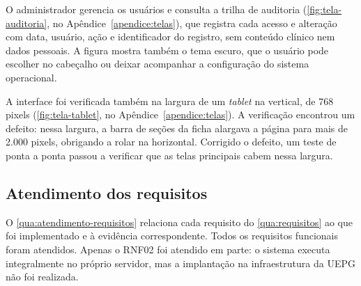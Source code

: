 O administrador gerencia os usuários e consulta a trilha de auditoria (\autoref{fig:tela-auditoria}, no Apêndice~\ref{apendice:telas}), que registra cada acesso e alteração com data, usuário, ação e identificador do registro, sem conteúdo clínico nem dados pessoais. A figura mostra também o tema escuro, que o usuário pode escolher no cabeçalho ou deixar acompanhar a configuração do sistema operacional.

A interface foi verificada também na largura de um \textit{tablet} na vertical, de 768 pixels (\autoref{fig:tela-tablet}, no Apêndice~\ref{apendice:telas}). A verificação encontrou um defeito: nessa largura, a barra de seções da ficha alargava a página para mais de 2.000 pixels, obrigando a rolar na horizontal. Corrigido o defeito, um teste de ponta a ponta passou a verificar que as telas principais cabem nessa largura.

\subsection{Atendimento dos requisitos}

O \autoref{qua:atendimento-requisitos} relaciona cada requisito do \autoref{qua:requisitos} ao que foi implementado e à evidência correspondente. Todos os requisitos funcionais foram atendidos. Apenas o RNF02 foi atendido em parte: o sistema executa integralmente no próprio servidor, mas a implantação na infraestrutura da UEPG não foi realizada.

